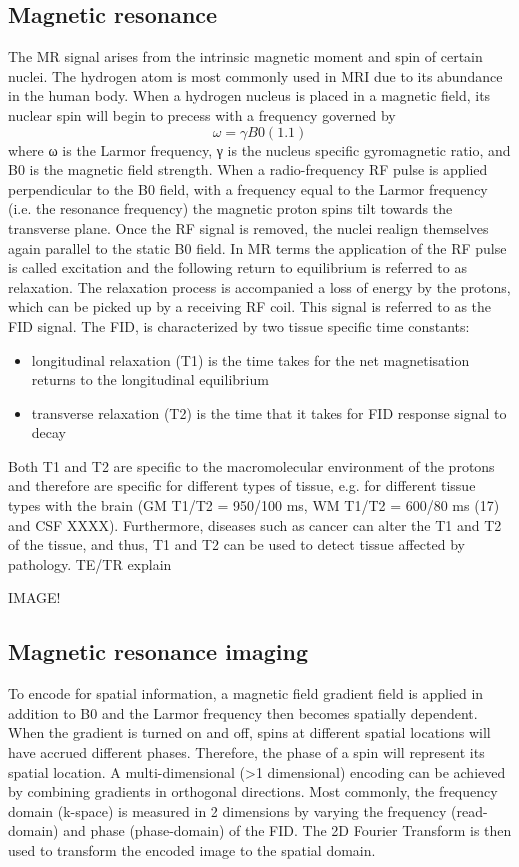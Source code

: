 \subsection*{Magnetic resonance}
The MR signal arises from the intrinsic magnetic moment and spin of certain nuclei. The hydrogen atom is most commonly used in MRI due to its abundance in the
human body. When a hydrogen nucleus is placed in a magnetic field, its nuclear spin will begin to precess with a frequency governed by
$$
ω =γB0 (1.1) 
$$
where ω is the Larmor frequency, γ is the nucleus specific gyromagnetic ratio, and B0 is the magnetic field strength. When a radio-frequency \gls{RF} pulse is applied perpendicular to the B0 field, with a frequency equal to the Larmor frequency (i.e. the resonance frequency) the magnetic proton spins tilt towards the transverse plane. Once the RF signal is removed, the nuclei realign themselves again parallel to the static B0 field. In MR terms the application of the \gls{RF} pulse is called excitation and the following return to equilibrium is referred to as relaxation. The relaxation process is accompanied a loss of energy by the protons, which can be picked up by a receiving RF coil. This signal is referred to as the \gls{FID} signal. The \gls{FID}, is characterized by two tissue specific time constants:  
\begin{itemize}
	\item longitudinal relaxation (T1) is the time takes for the net magnetisation returns to the longitudinal equilibrium
	\item transverse relaxation (T2) is the time that it takes for FID response signal to decay
\end{itemize}
Both T1 and T2 are specific to the macromolecular environment of the protons and therefore are specific for different types of tissue, e.g. for different tissue types with the brain (GM T1/T2 = 950/100 ms, WM T1/T2 = 600/80 ms (17) and CSF XXXX). Furthermore, diseases such as cancer can alter the T1 and T2 of the tissue, and thus, T1 and T2 can be used to detect tissue affected by pathology. TE/TR explain


IMAGE!

\subsection*{Magnetic resonance imaging}
To encode for spatial information, a magnetic field gradient field is applied in addition to B0 and the Larmor frequency then becomes spatially dependent. When the gradient is turned on and off, spins at different spatial locations will have accrued different phases. Therefore, the phase of a spin will represent its spatial location. A multi-dimensional (>1 dimensional) encoding can be achieved by combining gradients in orthogonal directions. Most commonly, the frequency domain (k-space) is measured in 2 dimensions by varying the frequency (read-domain) and phase (phase-domain) of the FID. The 2D Fourier Transform is then used to transform the encoded image to the spatial domain. 

